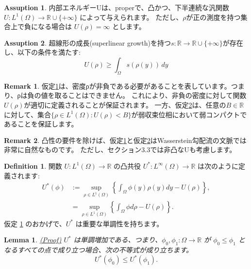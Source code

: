 \documentclass{jsarticle}
\newtheorem{lem}{Lemma}[section]
\theoremstyle{definition}
\newtheorem{dfn}{Definition}[section]
\newtheorem{rem}{Remark}[section]
\newtheorem{ass}{Assuption}[section]
\begin{document}
\begin{ass}
    \label{ass:rho>0}
    内部エネルギーUは、properで、凸かつ、下半連続な汎関数 $U: L^1(\Omega) \to \mathbb{R} \cup  \{+ \infty\}$ によって与えられます。
    ただし、$\rho$が正の測度を持つ集合上で負になる場合は $U(\rho) = \infty$ とします。
\end{ass}


\begin{ass}
    \label{ass:weakly compact}
    超線形の成長(superlinear growth)を持つ$s: \mathbb{R} \to \mathbb{R} \cup  \{+ \infty\}$が存在し、以下の条件を満たす:
    $$
        U(\rho) \geq \int_\Omega s(\rho(y)) \, dy
    $$
\end{ass}

\begin{rem}
    仮定\ref{ass:rho>0}は、密度ρが非負である必要があることを表しています。つまり、ρは負の値を取ることはできません。
    これにより、非負の密度に対して関数$U(\rho)$が適切に定義されることが保証されます。
    一方、仮定\ref{ass:weakly compact}は、任意の$B \in \mathbb{R}$に対して、集合$\{ \rho \in L^1(\Omega): U(\rho) < B\}$が弱収束位相において弱コンパクトであることを保証します。
\end{rem}

\begin{rem}
    凸性の要件を除けば、仮定\ref{ass:rho>0}と仮定\ref{ass:weakly compact}はWasserstein勾配流の文脈では非常に自然なものです。
    ただし、セクション3.3では非凸なUも考慮します。
\end{rem}

\begin{dfn}
    関数 $U: L^1(\Omega) \to \mathbb{R}$ の凸共役 $U^*: L^{\infty}(\Omega) \to \mathbb{R}$ は次のように定義されます:
    \begin{align*}
        U^*(\phi) &:= \sup_{\rho \in L^1(\Omega)} \left\{ \int_\Omega \phi(y) \rho(y) dy - U(\rho) \right\},\\
                  &= \sup_{\rho \in L^1(\Omega)} \left\{ \int_\Omega \phi d\rho - U(\rho) \right\}.
    \end{align*}
    仮定 \ref{ass:rho>0}  のおかげで、$U^*$ は重要な単調性を持ちます。
\end{dfn}

\begin{lem}
    \label{lem:monotone increasing}
    \hyperlink{proof:lem:monotone increasing}{(Proof)}
    $U^*$ は単調増加である、つまり、$\phi_0, \phi_1: \Omega \to \mathbb{R}$ が $\phi_0 \leq \phi_1$ となるすべての点で成り立つ場合、次の不等式が成り立ちます。
    $$
        U^*(\phi_0) \leq U^*(\phi_1).
    $$
\end{lem}
\end{document}
